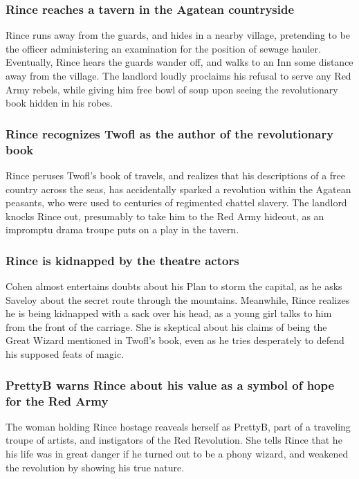 \subsubsection{\Gls{Rince} reaches a tavern in the Agatean countryside}
\Gls{Rince} runs away from the guards, and hides in a nearby village, pretending to be the officer
administering an examination for the position of sewage hauler. Eventually, \Gls{Rince} hears the
guards wander off, and walks to an Inn some distance away from the village. The landlord loudly
proclaims his refusal to serve any Red Army rebels, while giving him free bowl of soup upon seeing
the revolutionary book hidden in his robes.

\subsubsection{\Gls{Rince} recognizes \Gls{Twofl} as the author of the revolutionary book}
\Gls{Rince} peruses \Gls{Twofl}'s book of travels, and realizes that his descriptions of a free
country across the seas, has accidentally sparked a revolution within the Agatean peasants, who were
used to centuries of regimented chattel slavery. The landlord knocks \Gls{Rince} out, presumably to
take him to the Red Army hideout, as an impromptu drama troupe puts on a play in the tavern.

\subsubsection{\Gls{Rince} is kidnapped by the theatre actors}
\Gls{Cohen} almost entertains doubts about his Plan to storm the capital, as he asks \Gls{Saveloy}
about the secret route through the mountains. Meanwhile, \Gls{Rince} realizes he is being kidnapped
with a sack over his head, as a young girl talks to him from the front of the carriage. She is
skeptical about his claims of being the Great Wizard mentioned in \Gls{Twofl}'s book, even as he
tries desperately to defend his supposed feats of magic.

\subsubsection{\Gls{PrettyB} warns \Gls{Rince} about his value as a symbol of hope for the Red Army}
The woman holding \Gls{Rince} hostage reaveals herself as \Gls{PrettyB}, part of a traveling
troupe of artists, and instigators of the Red Revolution. She tells \Gls{Rince} that he his life was
in great danger if he turned out to be a phony wizard, and weakened the revolution by showing his
true nature.

